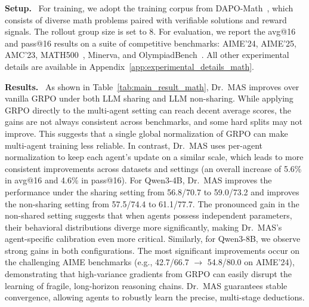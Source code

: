 \documentclass[]{fairmeta}
\theoremstyle{plain}
\theoremstyle{definition}
\theoremstyle{remark}
\newcommand{\methodname}{Dr.\ MAS}
\begin{document}
\textbf{Setup.}~
For training, we adopt the training corpus from DAPO-Math~\citep{yu2025dapo}, which consists of diverse math problems paired with verifiable solutions and reward signals. The rollout group size is set to 8. For evaluation, we report the avg@16 and pass@16 results on a suite of competitive benchmarks: AIME'24, AIME'25, AMC'23, MATH500~\citep{hendrycks2021measuring}, Minerva, and OlympiadBench~\citep{he2024olympiadbench}. All other experimental details are available in Appendix~\ref{app:experimental_details_math}.

\textbf{Results.}~
As shown in Table~\ref{tab:main_result_math}, \methodname{} improves over vanilla GRPO under both LLM sharing and LLM non-sharing. While applying GRPO directly to the multi-agent setting can reach decent average scores, the gains are not always consistent across benchmarks, and some hard splits may not improve. This suggests that a single global normalization of GRPO can make multi-agent training less reliable. In contrast, \methodname{} uses per-agent normalization to keep each agent’s update on a similar scale, which leads to more consistent improvements across datasets and settings (an overall increase of 5.6\% in avg@16 and 4.6\% in pass@16). For Qwen3-4B, \methodname{} improves the performance under the sharing setting from 56.8/70.7 to 59.0/73.2 and improves the non-sharing setting from 57.5/74.4 to 61.1/77.7. The pronounced gain in the non-shared setting suggests that when agents possess independent parameters, their behavioral distributions diverge more significantly, making \methodname{}'s agent-specific calibration even more critical. Similarly, for Qwen3-8B, we observe strong gains in both configurations. The most significant improvements occur on the challenging AIME benchmarks (e.g., 42.7/66.7 $\rightarrow$ 54.8/80.0 on AIME’24), demonstrating that high-variance gradients from GRPO can easily disrupt the learning of fragile, long-horizon reasoning chains. \methodname{} guarantees stable convergence, allowing agents to robustly learn the precise, multi-stage deductions.
\end{document}
